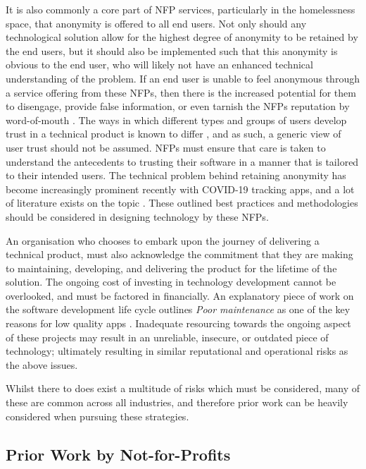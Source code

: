 It is also commonly a core part of NFP services, particularly in the homelessness space, that anonymity is offered to all end users. Not only should any technological solution allow for the highest degree of anonymity to be retained by the end users, but it should also be implemented such that this anonymity is obvious to the end user, who will likely not have an enhanced technical understanding of the problem. If an end user is unable to feel anonymous through a service offering from these NFPs, then there is the increased potential for them to disengage, provide false information, or even tarnish the NFPs reputation by word-of-mouth \cite{gefen2003managing}. The ways in which different types and groups of users develop trust in a technical product is known to differ \cite{xu2014different}, and as such, a generic view of user trust should not be assumed. NFPs must ensure that care is taken to understand the antecedents to trusting their software in a manner that is tailored to their intended users. The technical problem behind retaining anonymity has become increasingly prominent recently with COVID-19 tracking apps, and a lot of literature exists on the topic \cite{rowe2020contact} \cite{tang2020privacy} \cite{cho2020contact}. These outlined best practices and methodologies should be considered in designing technology by these NFPs.

An organisation who chooses to embark upon the journey of delivering a technical product, must also acknowledge the commitment that they are making to maintaining, developing, and delivering the product for the lifetime of the solution. The ongoing cost of investing in technology development cannot be overlooked, and must be factored in financially. An explanatory piece of work on the software development life cycle outlines \emph{Poor maintenance} as one of the key reasons for low quality apps \cite{inukollu2014factors}. Inadequate resourcing towards the ongoing aspect of these projects may result in an unreliable, insecure, or outdated piece of technology; ultimately resulting in similar reputational and operational risks as the above issues. 

Whilst there to does exist a multitude of risks which must be considered, many of these are common across all industries, and therefore prior work can be heavily considered when pursuing these strategies.

\subsection{Prior Work by Not-for-Profits}

